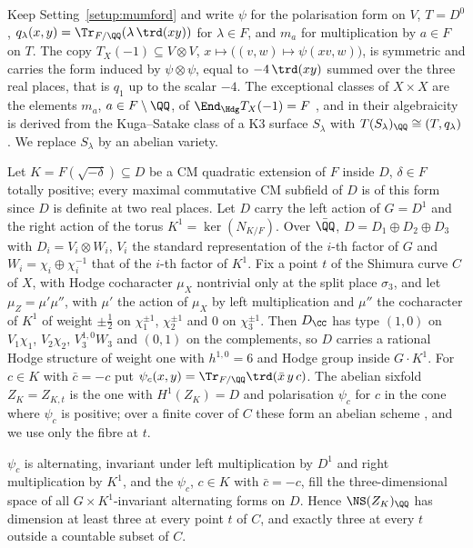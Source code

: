 Keep Setting~\ref{setup:mumford} and write $\psi$ for the polarisation form on $V$, $T=D^{0}$, $q_{\lambda}(x,y)=\Tr_{F/\QQ}(\lambda\,\trd(xy))$ for $\lambda\in F$, and $m_{a}$ for multiplication by $a\in F$ on $T$. The copy $T_{X}(-1)\subseteq V\otimes V$, $x\mapsto\bigl((v,w)\mapsto\psi(xv,w)\bigr)$, is symmetric and carries the form induced by $\psi\otimes\psi$, equal to $-4\,\trd(xy)$ summed over the three real places, that is $q_{1}$ up to the scalar $-4$. The exceptional classes of $X\times X$ are the elements $m_{a}$, $a\in F\setminus\QQ$, of $\End_{\Hdg}T_{X}(-1)=F$ \cite[Prop.~21.2]{BMB26}, and in \cite[Thm.~21.4]{BMB26} their algebraicity is derived from the Kuga--Satake class of a K3 surface $S_{\lambda}$ with $T(S_{\lambda})_{\QQ}\cong(T,q_{\lambda})$. We replace $S_{\lambda}$ by an abelian variety.

\begin{setup}\label{setup:zk}
Let $K=F(\sqrt{-\delta})\subseteq D$ be a CM quadratic extension of $F$ inside $D$, $\delta\in F$ totally positive; every maximal commutative CM subfield of $D$ is of this form since $D$ is definite at two real places. Let $D$ carry the left action of $G=D^{1}$ and the right action of the torus $K^{1}=\ker(N_{K/F})$. Over $\bar\QQ$, $D=D_{1}\oplus D_{2}\oplus D_{3}$ with $D_{i}=V_{i}\otimes W_{i}$, $V_{i}$ the standard representation of the $i$-th factor of $G$ and $W_{i}=\chi_{i}\oplus\chi_{i}^{-1}$ that of the $i$-th factor of $K^{1}$. Fix a point $t$ of the Shimura curve $C$ of $X$, with Hodge cocharacter $\mu_{X}$ nontrivial only at the split place $\sigma_{3}$, and let $\mu_{Z}=\mu'\mu''$, with $\mu'$ the action of $\mu_{X}$ by left multiplication and $\mu''$ the cocharacter of $K^{1}$ of weight $\pm\tfrac12$ on $\chi_{1}^{\pm1}$, $\chi_{2}^{\pm1}$ and $0$ on $\chi_{3}^{\pm1}$. Then $D_{\CC}$ has type $(1,0)$ on $V_{1}\chi_{1}$, $V_{2}\chi_{2}$, $V_{3}^{1,0}W_{3}$ and $(0,1)$ on the complements, so $D$ carries a rational Hodge structure of weight one with $h^{1,0}=6$ and Hodge group inside $G\cdot K^{1}$. For $c\in K$ with $\bar c=-c$ put $\psi_{c}(x,y)=\Tr_{F/\QQ}\trd(\bar x\,y\,c)$. The abelian sixfold $Z_{K}=Z_{K,t}$ is the one with $H^{1}(Z_{K})=D$ and polarisation $\psi_{c}$ for $c$ in the cone where $\psi_{c}$ is positive; over a finite cover of $C$ these form an abelian scheme \cite{Shi63}, and we use only the fibre at $t$.
\end{setup}

\begin{lemma}\label{lem:polarisations}
$\psi_{c}$ is alternating, invariant under left multiplication by $D^{1}$ and right multiplication by $K^{1}$, and the $\psi_{c}$, $c\in K$ with $\bar c=-c$, fill the three-dimensional space of all $G\times K^{1}$-invariant alternating forms on $D$. Hence $\NS(Z_{K})_{\QQ}$ has dimension at least three at every point $t$ of $C$, and exactly three at every $t$ outside a countable subset of $C$.
\end{lemma}


